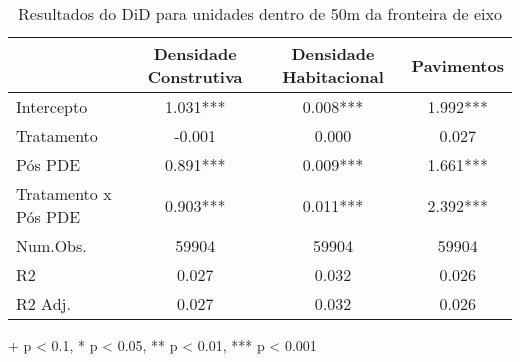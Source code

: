\begin{table}[h]
  \centering
\caption{Resultados do DiD para unidades dentro de 50m da fronteira de eixo} 
\fontsize{10pt}{12pt}\selectfont
\begin{tabular*}{.85\linewidth}{@{\extracolsep{\fill}}lccc}
\toprule
  & Densidade Construtiva & Densidade Habitacional & Pavimentos \\ 
\midrule\addlinespace[2.5pt]
Intercepto & 1.031*** & 0.008*** & 1.992*** \\ 
Tratamento & -0.001 & 0.000 & 0.027 \\ 
Pós PDE & 0.891*** & 0.009*** & 1.661*** \\ 
{Tratamento x Pós PDE} & {0.903***} & {0.011***} & {2.392***} \\ 
\midrule
Num.Obs. & 59904 & 59904 & 59904 \\ 
R2 & 0.027 & 0.032 & 0.026 \\ 
R2 Adj. & 0.027 & 0.032 & 0.026 \\ 
\bottomrule
\end{tabular*}
\begin{minipage}{.85\linewidth}
+ p < 0.1, * p < 0.05, ** p < 0.01, *** p < 0.001\\
\end{minipage}
\label{tab:did-IPTU}
\end{table}

